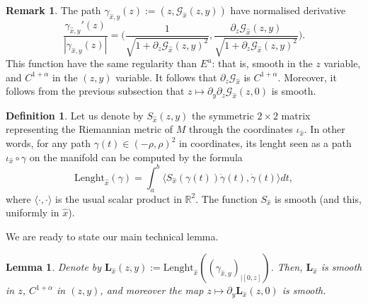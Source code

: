 \documentclass[a4paper]{article}
\newtheorem{lemma}[theorem]{Lemma}
\theoremstyle{definition}
\newtheorem{definition}{Definition}[section]
\newtheorem{remark}[example]{Remark}
\begin{document}
\begin{remark}
The path $\gamma_{{\widehat{x}},y}(z) := (z,\mathcal{G}_{\widehat{x}}(z,y))$ have normalised derivative
$$ \frac{\gamma_{{\widehat{x}},y}'(z)}{|\gamma_{{\widehat{x}},y}(z)|} = \Big( \frac{1}{\sqrt{1+\partial_z \mathcal{G}_{\widehat{x}}(z,y)^2}} , \frac{\partial_z \mathcal{G}_{\widehat{x}}(z,y)}{\sqrt{1+\partial_z \mathcal{G}_{\widehat{x}}(z,y)^2}} \Big) .$$
This function have the same regularity than $E^u$: that is, smooth in the $z$ variable, and $C^{1+\alpha}$ in the $(z,y)$ variable. It follows that $\partial_z \mathcal{G}_{\widehat{x}}$ is $C^{1+\alpha}$. Moreover, it follows from the previous subsection that $ z \mapsto \partial_y \partial_z \mathcal{G}_{\widehat{x}}(z,0)$ is smooth.
\end{remark}

\begin{definition}
Let us denote by $S_{\widehat{x}}(z,y)$ the symmetric $2\times 2$ matrix representing the Riemannian metric of $M$ through the coordinates $\iota_{\widehat{x}}$. In other words, for any path $\gamma(t)  \in (-\rho,\rho)^2$ in coordinates, its lenght seen as a path $\iota_{\widehat{x}} \circ \gamma$ on the manifold can be computed by the formula
$$ \text{Lenght}_{\widehat{x}}(\gamma) = \int_a^b \langle S_{\widehat{x}}( \gamma(t)) \dot{\gamma}(t), \dot{\gamma}(t) \rangle dt ,$$
where $\langle \cdot , \cdot \rangle$ is the usual scalar product in $\mathbb{R}^2$. The function $S_{\widehat{x}}$ is smooth (and this, uniformly in ${\widehat{x}}$).
\end{definition}

We are ready to state our main technical lemma.

\begin{lemma}
Denote by $\mathbf{L}_{\widehat{x}}(z,y) := \text{Lenght}_{\widehat{x}}((\gamma_{{\widehat{x}},y})_{|[0,z]})$. Then, $\mathbf{L}_{\widehat{x}}$ is smooth in $z$, $C^{1+\alpha}$ in $(z,y)$, and moreover the map $z \mapsto \partial_y \mathbf{L}_{\widehat{x}}(z,0)$ is smooth.
\end{lemma}
\end{document}
